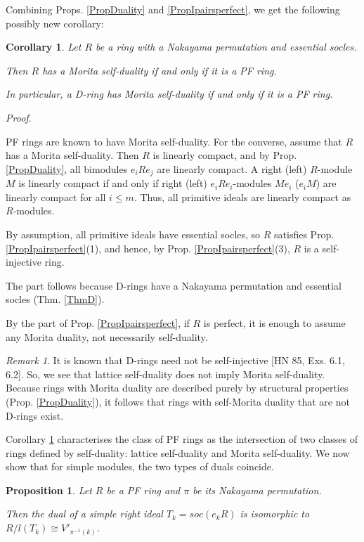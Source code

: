 \documentclass[11pt]{article}
\theoremstyle{plain}
\newtheorem{Prop}[veta]{Proposition}
\newtheorem{Cor}[veta]{Corollary}
\theoremstyle{remark}
\newtheorem*{remark}{Remark}
\theoremstyle{plain}
\newenvironment{Proof}{
  \par\medskip\noindent
  \textit{Proof}.
}{
\newline
\rightline{$\qedsymbol$}
}
\begin{document}
Combining Props. \ref{PropDuality} and \ref{PropIpairsperfect}, we get the following possibly new corollary:
\begin{Cor}\label{CorDualPF}
Let $R$ be a ring with a Nakayama permutation and essential socles.

Then $R$ has a Morita self-duality if and only if it is a PF ring.   

In particular, a D-ring has Morita self-duality if and only if it is a PF ring.
\end{Cor}
\begin{Proof}
PF rings are known to have Morita self-duality. For the converse, assume that $R$ has a Morita self-duality. Then $R$ is linearly compact, and by Prop. \ref{PropDuality}, all bimodules $e_iRe_j$ are linearly compact. A right (left) $R$-module $M$ is linearly compact if and only if right (left) $e_iRe_i$-modules $Me_i$ ($e_iM$) are linearly compact for all $i\leq m$. Thus, all primitive ideals are linearly compact as $R$-modules. 

    By assumption, all primitive ideals have essential socles, so $R$ satisfies  Prop. \ref{PropIpairsperfect}(1), and hence, by Prop. \ref{PropIpairsperfect}(3), $R$ is a self-injective ring.  

    The  part follows because D-rings have a Nakayama permutation and essential socles (Thm. \ref{ThmD}).
    \end{Proof}
    By the  part of Prop. \ref{PropIpairsperfect}, if $R$ is perfect, it is enough to assume any Morita duality, not necessarily self-duality.
\begin{remark}
    It is known that D-rings need not be self-injective [HN 85,  Exs. 6.1, 6.2]. So, we see that lattice self-duality does not imply Morita self-duality. Because rings with Morita duality are described purely by structural properties (Prop. \ref{PropDuality}), it follows that rings with self-Morita duality that are not D-rings exist. 
\end{remark}
Corollary \ref{CorDualPF} characterises the class of PF rings as the intersection of two classes of rings defined by self-duality: lattice self-duality and Morita self-duality. We now show that for simple modules, the two types of duals coincide. 
\begin{Prop}
Let $R$ be a  PF ring and $\pi$ be its Nakayama permutation.

Then the dual of a simple right ideal $T_k=soc(e_kR)$ is isomorphic to $R/l(T_k)\cong V'_{\pi^{-1}(k)}$.
\end{Prop}
\end{document}
